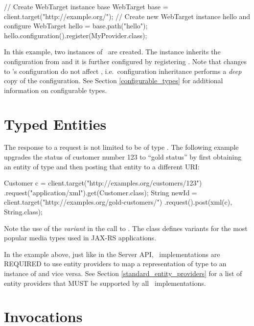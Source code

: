 \begin{listing}{1}
// Create WebTarget instance base
WebTarget base = client.target("http://example.org/");
// Create new WebTarget instance hello and configure
WebTarget hello = base.path("hello");
hello.configuration().register(MyProvider.class);
\end{listing}

In this example, two instances of \WebTarget\ are created. The instance  inherits the configuration from  and it is further configured by registering . Note that changes to 's configuration do not affect , i.e.~configuration inheritance performs a {\em deep} copy of the configuration. See Section \ref{configurable_types} for additional information on configurable types.

\section{Typed Entities}

The response to a request is not limited to be of type \Response. The following example upgrades the status of customer number 123 to ``gold status'' by first obtaining an entity of type  and then posting that entity to a different URI:

\begin{listing}{1}
Customer c = client.target("http://examples.org/customers/123")
    .request("application/xml").get(Customer.class);
String newId = client.target("http://examples.org/gold-customers/")
    .request().post(xml(c), String.class);
\end{listing}

Note the use of the {\em variant}  in the call to . The class  defines variants for the most popular media types used in JAX-RS applications.

In the example above, just like in the Server API, \jaxrs\ implementations are REQUIRED to use entity providers to map a representation of type  to an instance of  and vice versa. See Section \ref{standard_entity_providers} for a list of entity providers that MUST be supported by all \jaxrs\ implementations.

\section{Invocations}
\label{invocations}

